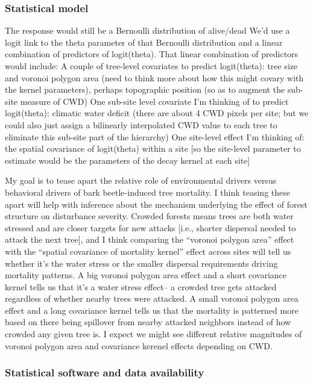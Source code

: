 \documentclass[]{article}
\begin{document}
\subsubsection{Statistical model}\label{statistical-model}

The response would still be a Bernoulli distribution of alive/dead We'd
use a logit link to the theta parameter of that Bernoulli distribution
and a linear combination of predictors of logit(theta). That linear
combination of predictors would include: A couple of tree-level
covariates to predict logit(theta): tree size and voronoi polygon area
(need to think more about how this might covary with the kernel
parameters), perhaps topographic position (so as to augment the sub-site
measure of CWD) One sub-site level covariate I'm thinking of to predict
logit(theta): climatic water deficit (there are about 4 CWD pixels per
site; but we could also just assign a bilinearly interpolated CWD value
to each tree to eliminate this sub-site part of the hierarchy) One
site-level effect I'm thinking of: the spatial covariance of
logit(theta) within a site {[}so the site-level parameter to estimate
would be the parameters of the decay kernel at each site{]}

My goal is to tease apart the relative role of environmental drivers
versus behavioral drivers of bark beetle-induced tree mortality. I think
teasing these apart will help with inference about the mechanism
underlying the effect of forest structure on disturbance severity.
Crowded forests means trees are both water stressed and are closer
targets for new attacks {[}i.e., shorter dispersal needed to attack the
next tree{]}, and I think comparing the ``voronoi polygon area'' effect
with the ``spatial covariance of mortality kernel'' effect across sites
will tell us whether it's the water stress or the smaller dispersal
requirements driving mortality patterns. A big voronoi polygon area
effect and a short covariance kernel tells us that it's a water stress
effect-- a crowded tree gets attacked regardless of whether nearby trees
were attacked. A small voronoi polygon area effect and a long covariance
kernel tells us that the mortality is patterned more based on there
being spillover from nearby attacked neighbors instead of how crowded
any given tree is. I expect we might see different relative magnitudes
of voronoi polygon area and covariance kerenel effects depending on CWD.

\subsubsection{Statistical software and data
availability}\label{statistical-software-and-data-availability}
\end{document}
